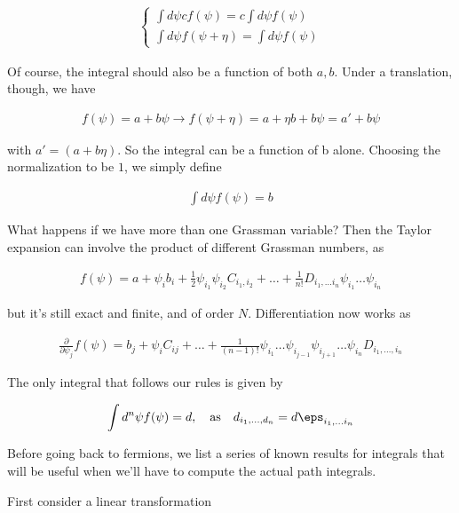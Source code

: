 \documentclass{report}
\begin{document}
\begin{align}
    \begin{cases}
        \int d\psi cf(\psi) = c\int d\psi f(\psi) \\
        \int d\psi f(\psi +\eta) = \int d\psi f(\psi)
    \end{cases}
\end{align}

Of course, the integral should also be a function of both \(a, b\). Under a translation, though, we have 

\begin{align}
    f(\psi) = a +b\psi \rightarrow f(\psi +\eta) = a + \eta b + b\psi = a' + b\psi
\end{align}

with \(a' = (a+b\eta)\). So the integral can be a function of b alone. Choosing the normalization to be \(1\), we simply define 

\begin{align}
    \int d\psi f(\psi) = b
\end{align}

What happens if we have more than one Grassman variable? Then the Taylor expansion can involve the product of different Grassman numbers, as 

\begin{align}
    f(\psi) = a + \psi_i b_i + \frac{1}{2}\psi_{i_1}\psi_{i_2}C_{i_1, i_2} + \ldots + \frac{1}{n!}D_{i_1, \ldots i_n}\psi_{i_1}\ldots\psi_{i_n}
\end{align}

but it's still exact and finite, and of order \(N\). Differentiation now works as 

\begin{align}
    \frac{\partial}{\partial \psi_j}f(\psi) = b_j + \psi_i C_{ij} + \ldots + \frac{1}{(n-1)!}\psi_{i_1}\ldots\psi_{i_{j-1}}\psi_{i_{j+1}}\ldots \psi_{i_n}D_{i_1, \ldots, i_n}
\end{align}

The only integral that follows our rules is given by 

\begin{align}
    \int d^n \psi f(\psi) = d, \quad \text{as} \quad d_{i_1, \ldots, d_n} = d\eps_{i_1, \ldots i_n}
\end{align}

Before going back to fermions, we list a series of known results for integrals that will be useful when we'll have to compute the actual path integrals. 

First consider a linear transformation 
\end{document}
